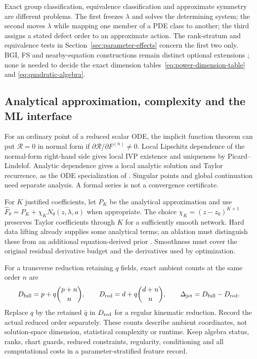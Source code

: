\documentclass[11pt]{article}
\theoremstyle{definition}
\begin{document}
Exact group classification, equivalence classification and approximate
symmetry are different problems. The first freezes $\lambda$ and solves the
determining system; the second moves $\lambda$ while mapping one member of a
PDE class to another; the third assigns a stated defect order to an
approximate action. The rank-stratum and equivalence tests in
Section~\ref{sec:parameter-effects} concern the first two only. BGI, FS and
nearby-equation constructions remain distinct optional extensions
\cite{kovalev,tarayrah2023,approxalg}; none is needed to decide the exact
dimension tables~\eqref{eq:power-dimension-table} and
\eqref{eq:quadratic-algebra}.

\subsection{Analytical approximation, complexity and the ML interface}
\label{sec:complexity-core}
For an ordinary point of a reduced scalar ODE, the implicit function theorem
can put $\mathcal R=0$ in normal form if
$\partial\mathcal R/\partial F^{(\bar n)}\ne0$. Local Lipschitz dependence
of the normal-form right-hand side gives local IVP existence and uniqueness
by Picard--Lindelof. Analytic dependence gives a local analytic solution
and Taylor recurrence, as the ODE specialization of
\cite[Theorem~2.73, p.~166]{olver}. Singular points and global continuation
need separate analysis. A formal series is not a convergence certificate.

For $K$ justified coefficients, let $P_K$ be the analytical approximation and
use $\widehat F_\theta=P_K+\chi_KN_\theta(z,\lambda,a)$ when appropriate.
The choice $\chi_K=(z-z_0)^{K+1}$ preserves Taylor coefficients through $K$
for a sufficiently smooth network. Hard data lifting already supplies some
analytical terms; an ablation must distinguish these from an additional
equation-derived prior \cite{lagaris}. Smoothness must cover the original
residual derivative budget and the derivatives used by optimization.

For a transverse reduction retaining $q$ fields, exact ambient counts at the
same order $n$ are
\begin{equation}
 D_{\rm full}=p+q\binom{p+n}{n},\qquad
 D_{\rm red}=d+q\binom{d+n}{n},\qquad
 \Delta_{\rm jet}=D_{\rm full}-D_{\rm red}.
 \label{eq:fundamental-jet-count}
\end{equation}
Replace $q$ by the retained $\bar q$ in $D_{\rm red}$ for a regular kinematic
reduction. Record the actual reduced order separately. These counts describe
ambient coordinates, not solution-space dimension, statistical complexity or
runtime. Keep algebra status, ranks, chart guards, reduced constraints,
regularity, conditioning and all computational costs in a parameter-stratified
feature record.
\end{document}
